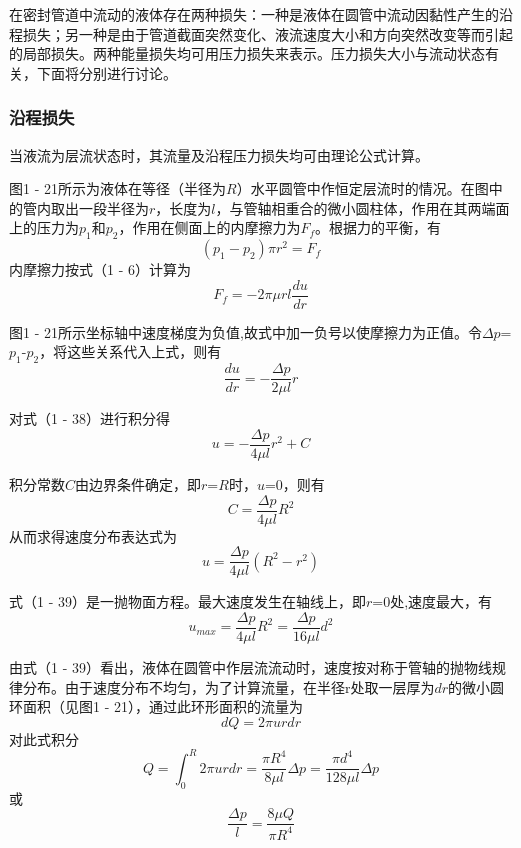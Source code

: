 在密封管道中流动的液体存在两种损失：一种是液体在圆管中流动因黏性产生的沿程损失；另一种是由于管道截面突然变化、液流速度大小和方向突然改变等而引起的局部损失。两种能量损失均可用压力损失来表示。压力损失大小与流动状态有关，下面将分别进行讨论。


\subsubsection*{沿程损失}

当液流为层流状态时，其流量及沿程压力损失均可由理论公式计算。

图1 - 21所示为液体在等径（半径为$R$）水平圆管中作恒定层流时的情况。在图中的管内取出一段半径为$r$，长度为$l$，与管轴相重合的微小圆柱体，作用在其两端面上的压力为$p_{1}$和$p_{2}$，作用在侧面上的内摩擦力为$F_{f}$。根据力的平衡，有
\begin{equation*}
(p_{1}-p_{2})\pi r^{2}=F_{f}
\end{equation*}
内摩擦力按式（1 - 6）计算为
\begin{equation*}
F_{f}=-2\pi \mu rl \frac{du}{dr}
\end{equation*}

图1 - 21所示坐标轴中速度梯度为负值,故式中加一负号以使摩擦力为正值。令$\Delta p$=$p_{1}$-$p_{2}$，将这些关系代入上式，则有
\begin{equation}
\frac{du}{dr}=-\frac{\Delta p}{2\mu l}r
\end{equation}

\noindent 对式（1 - 38）进行积分得
\begin{equation*}
u=-\frac{\Delta p}{4\mu l}r^{2}+C
\end{equation*}

\noindent 积分常数$C$由边界条件确定，即$r$=$R$时，$u$=0，则有
\begin{equation*}
C=\frac{\Delta p}{4\mu l}R^{2}
\end{equation*}
从而求得速度分布表达式为
\begin{equation}
u=\frac{\Delta p}{4\mu l}(R^{2}-r^{2})
\end{equation}

\noindent 式（1 - 39）是一抛物面方程。最大速度发生在轴线上，即$r$=0处,速度最大，有
\begin{equation}
u_{max}=\frac{\Delta p}{4\mu l}R^{2}=\frac{\Delta p}{16\mu l}d^{2}
\end{equation}

由式（1 - 39）看出，液体在圆管中作层流流动时，速度按对称于管轴的抛物线规律分布。由于速度分布不均匀，为了计算流量，在半径r处取一层厚为$dr$的微小圆环面积（见图1 - 21），通过此环形面积的流量为
\begin{equation*}
dQ=2\pi urdr
\end{equation*}
对此式积分
\begin{equation}
Q=\int_{0} ^{R}2\pi urdr=\frac{\pi R^{4}}{8\mu l}\Delta p=\frac{\pi d^{4}}{128\mu l}\Delta p
\end{equation}
或
\begin{equation*}
\frac{\Delta p}{l}=\frac{8\mu Q}{\pi R^{4}}
\end{equation*}

